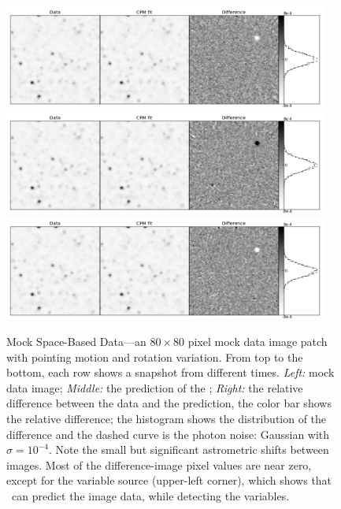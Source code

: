 \begin{figure}[p]
\begin{center}
\includegraphics[width=0.95\textwidth]{figures/cdi/f1a}
\includegraphics[width=0.95\textwidth]{figures/cdi/f1b}
\includegraphics[width=0.95\textwidth]{figures/cdi/f1c}
\end{center}
\caption[The \cpmdiff\ for mock space-based data]{
\label{space}
  Mock Space-Based Data---an $80\times 80$ pixel mock data image patch with pointing motion and rotation variation. 
  From top to the bottom, each row shows a snapshot from different times.
  \emph{Left:} mock data image;
  \emph{Middle:} the prediction of the \cpmdiff;
  \emph{Right:} the relative difference between the data and the prediction, the color bar shows the relative difference;
  the histogram shows the distribution of the difference and the dashed curve is the photon noise: Gaussian with $\sigma = 10^{-4}$.
  Note the small but significant astrometric shifts between images.
  Most of the difference-image pixel values are near zero, except for the variable source (upper-left corner), which shows that \cpmdiff\ can predict the image data, while detecting the variables. 
}
\end{figure}

